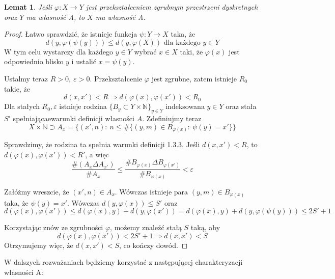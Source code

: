 \documentclass[licencjacka]{pracamgr}
\theoremstyle{definition}
\theoremstyle{definition}
\theoremstyle{definition}
\theoremstyle{definition}
\theoremstyle{definition}
\theoremstyle{plain}
\newtheorem{lemma}{Lemat}[section]
\theoremstyle{plain}
\begin{document}
\begin{lemma}
	Jeśli $ \varphi: X \rightarrow Y $ jest przekształceniem zgrubnym przestrzeni dyskretnych 
	oraz $ Y $ ma własność A, to $ X $ ma własność A.
\end{lemma}
\begin{proof}
	Łatwo sprawdzić, że istnieje funkcja $\psi: Y \rightarrow X $ taka, że
	$$ d(y, \varphi(\psi(y)))  \leq d(y,  \varphi(X)) \text{ dla każdego } y \in Y$$
	W tym celu wystarczy dla każdego $ y \in Y $ wybrać $ x \in X $ taki, że 
	$ \varphi(x) $ jest odpowiednio blisko $ y $ i ustalić $ x = \psi(y) $.

	Ustalmy teraz $ R > 0,~  \varepsilon > 0 $. Przekształcenie $\varphi$ jest zgrubne, zatem 
	istnieje $ R_0 $ takie, że $$ d(x,x') < R \Rightarrow d(\varphi(x), \varphi(x')) < R_0 $$ 
	Dla stałych $ R_0, \varepsilon $ istnieje rodzina 
	$ \{B_y \subset Y \times \mathbb{N}\}_{y \in Y} $ 
	indeksowana $ y \in Y $ oraz stała $S'$ spełniającaewarunki definicji własności $ A $.
 	 Zdefiniujmy 
	teraz 
	$$ X \times \mathbb{N} \supset A_x = \{(x', n): ~ n \leq \# \{ (y,m) \in B_{\varphi(x)} : ~
	\psi(y) = x' \}\} $$

	Sprawdzimy, że rodzina ta spełnia warunki definicji 1.3.3. Jeśli 
	$ d(x,x') < R $, to $ d(\varphi(x), \varphi(x')) < R' $, a więc 
	$$ \frac{\# (A_x \Delta A_{x'})}{\# A_x} \leq \frac{\# B_{\varphi(x)} \Delta 
	B_{\varphi(x')}}{\# B_{\varphi(x)}} < \varepsilon $$

	Załóżmy wreszcie, że $ (x', n) \in A_x $. Wówczas istnieje para $ (y,m) \in 
	B_{\varphi(x)} $ taka, że $ \psi(y) = x' $. Wówczas $d(y,\varphi(x)) \leq S'$ oraz 
	$$ d(\varphi(x), \varphi(x')) \leq d(\varphi(x),y) + d(y,\varphi(x')) = d(\varphi(x),y) + 
	d(y, \varphi(\psi(y))) \leq 2S' + 1 $$

	Korzystając znów ze zgrubności $\varphi$, możemy znaleźć stałą $ S $ taką, aby 
	$$ d(\varphi(x), \varphi(x')) < 2S' +1 \Rightarrow d(x,x') < S $$
	Otrzymujemy więc, że $ d(x,x') < S $, co kończy dowód.
\end{proof}

W dalszych rozważaniach będziemy korzystać z następującej charakteryzacji własności A:
\end{document}

